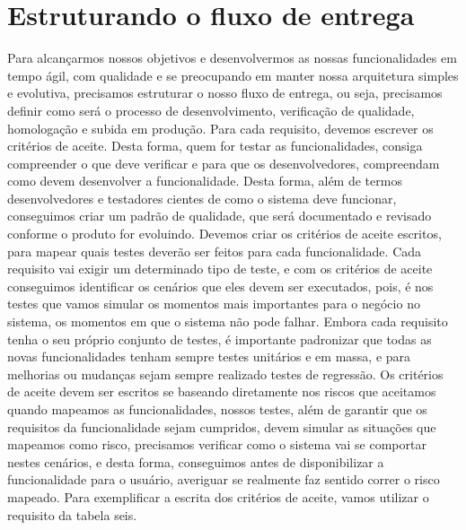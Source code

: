     \section{Estruturando o fluxo de entrega}
      Para alcançarmos nossos objetivos e desenvolvermos as nossas funcionalidades
      em tempo ágil, com qualidade e se preocupando em manter nossa arquitetura
      simples e evolutiva, precisamos estruturar o nosso fluxo de entrega, ou seja,
      precisamos definir como será o processo de desenvolvimento, verificação de
      qualidade, homologação e subida em produção. \newline
      Para cada requisito, devemos escrever os critérios de aceite. Desta forma,
      quem for testar as funcionalidades, consiga compreender o que deve verificar
      e para que os desenvolvedores, compreendam como devem desenvolver a
      funcionalidade. Desta forma, além de termos desenvolvedores e testadores
      cientes de como o sistema deve funcionar, conseguimos criar um padrão de
      qualidade, que será documentado e revisado conforme o produto for evoluindo.
      Devemos criar os critérios de aceite escritos, para mapear quais testes deverão
      ser feitos para cada funcionalidade. Cada requisito vai exigir um determinado
      tipo de teste, e com os critérios de aceite conseguimos identificar os cenários
      que eles devem ser executados, pois, é nos testes que vamos simular os momentos
      mais importantes para o negócio no sistema, os momentos em que o sistema não
      pode falhar. Embora cada requisito tenha o seu próprio conjunto de testes,
      é importante padronizar que todas as novas funcionalidades tenham sempre testes
      unitários e em massa, e para melhorias ou mudanças sejam sempre realizado testes
      de regressão. Os critérios de aceite devem ser escritos se baseando diretamente
      nos riscos que aceitamos quando mapeamos as funcionalidades, nossos testes,
      além de garantir que os requisitos da funcionalidade sejam cumpridos, devem
      simular as situações que mapeamos como risco, precisamos verificar como o sistema
      vai se comportar nestes cenários, e desta forma, conseguimos antes de disponibilizar
      a funcionalidade para o usuário, averiguar se realmente faz sentido correr
      o risco mapeado. Para exemplificar a escrita dos critérios de aceite, vamos
      utilizar o requisito da tabela seis. \newline

